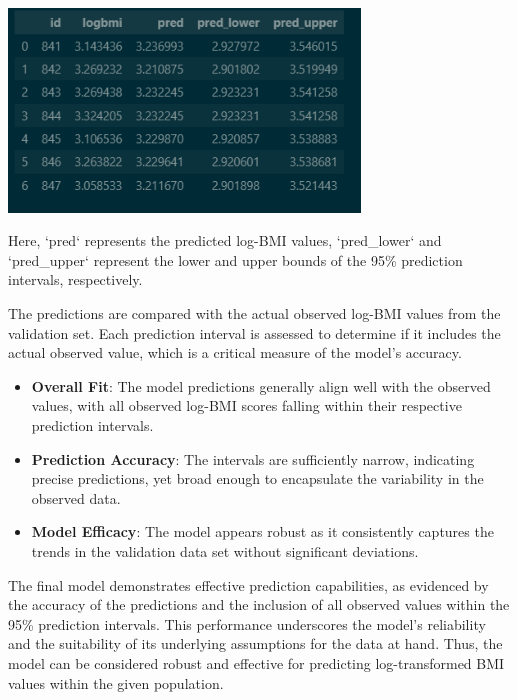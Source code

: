 \documentclass{rapport}
\begin{document}
\begin{center}
\includegraphics[width=0.7\textwidth]{Figures/Table.png}
\end{center}

\noindent
Here, `pred` represents the predicted log-BMI values, `pred\_lower` and `pred\_upper` represent the lower and upper bounds of the 95\% prediction intervals, respectively.


\noindent
The predictions are compared with the actual observed log-BMI values from the validation set. Each prediction interval is assessed to determine if it includes the actual observed value, which is a critical measure of the model's accuracy.

\begin{itemize}
    \item \textbf{Overall Fit}: The model predictions generally align well with the observed values, with all observed log-BMI scores falling within their respective prediction intervals.
    \item \textbf{Prediction Accuracy}: The intervals are sufficiently narrow, indicating precise predictions, yet broad enough to encapsulate the variability in the observed data.
    \item \textbf{Model Efficacy}: The model appears robust as it consistently captures the trends in the validation data set without significant deviations.
\end{itemize}


\noindent
The final model demonstrates effective prediction capabilities, as evidenced by the accuracy of the predictions and the inclusion of all observed values within the 95\% prediction intervals. This performance underscores the model's reliability and the suitability of its underlying assumptions for the data at hand. Thus, the model can be considered robust and effective for predicting log-transformed BMI values within the given population.
\end{document}
